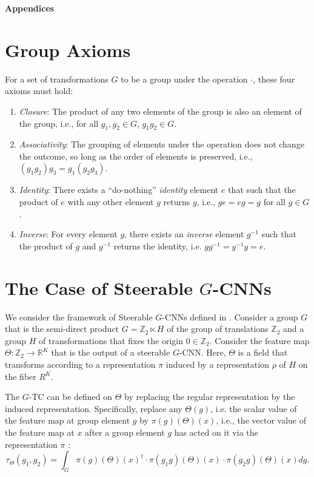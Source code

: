 \appendix


\Large \textbf{Appendices}
\normalsize

\section{Group Axioms}\label{sec:group_axioms}


For a set of transformations $G$ to be a group under the operation $\cdot$, these four axioms must hold:

\begin{enumerate}
    \item \textit{Closure}: The product of any two elements of the group is also an element of the group, i.e., for all $g_1, g_2 \in G$, $g_1g_2 \in G$.
    \item \textit{Associativity}: The grouping of elements under the operation does not change the outcome, so long as the order of elements is preserved, i.e., $(g_1g_2)g_3 = g_1(g_2g_3)$.
    \item \textit{Identity}: There exists a ``do-nothing'' \textit{identity} element $e$ that such that the product of $e$ with any other element $g$ returns $g$, i.e., $ge = eg = g$ for all $g \in G$.
    \item \textit{Inverse}: For every element $g$, there exists an \textit{inverse} element $g^{-1}$  such that the product of $g$ and $g^{-1}$ returns the identity, i.e. $gg^{-1} = g^{-1}g = e$.
\end{enumerate}


\section{The Case of Steerable $G$-CNNs}\label{app:steerable}

We consider the framework of Steerable $G$-CNNs defined in \cite{cohen2016steerable}. Consider a group $G$ that is the semi-direct product $G=\mathbb{Z}_2 \ltimes H$ of the group of translations $\mathbb{Z}_2$ and a group $H$ of transformations that fixes the origin $0 \in \mathbb{Z}_2$. Consider the feature map $\Theta: \mathbb{Z}_2 \rightarrow \mathbb{R}^K$ that is the output of a steerable $G$-CNN. Here, $\Theta$ is a field that transforms according to a representation $\pi$ induced by a representation $\rho$ of $H$ on the fiber $R^K$.

The $G$-TC can be defined on $\Theta$ by replacing the regular representation by the induced representation. Specifically, replace any $\Theta(g)$, i.e. the scalar value of the feature map at group element $g$ by $\pi(g)(\Theta)(x)$, i.e., the vector value of the feature map at $x$ after a group element $g$ has acted on it via the representation $\pi$ :
$$
\tau_\Theta (g_1, g_2) =\int_G \pi(g)(\Theta)(x)^{\dagger} \cdot \pi\left(g_1 g\right)(\Theta)(x) \cdot \pi\left(g_2 g\right)(\Theta)(x) d g.
$$

